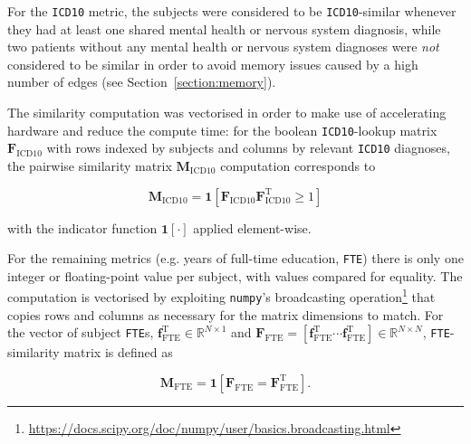 For the \texttt{ICD10} metric, the subjects were considered to be \texttt{ICD10}-similar whenever they had at least one shared mental health or nervous system diagnosis, while two patients without any mental health or nervous system diagnoses were \textit{not} considered to be similar in order to avoid memory issues caused by a high number of edges (see Section~\ref{section:memory}). 

The similarity computation was vectorised in order to make use of accelerating hardware and reduce the compute time: for the boolean \texttt{ICD10}-lookup matrix $\mathbf{F}_{\text{ICD10}}$ with rows indexed by subjects and columns by relevant \texttt{ICD10} diagnoses, the pairwise similarity matrix $\mathbf{M}_{\text{ICD10}}$ computation corresponds to 

\begin{equation}
    \mathbf{M}_{\text{ICD10}} = \mathbf{1}\left[\mathbf{F}_{\text{ICD10}}^{\ }\mathbf{F}_{\text{ICD10}}^{\mathrm{T}} \geq 1\right]
\end{equation}

with the indicator function $\mathbf{1}[\cdot]$ applied element-wise.

For the remaining metrics (e.g. years of full-time education, \texttt{FTE}) there is only one integer or floating-point value per subject, with values  compared for equality. The computation is vectorised by exploiting \texttt{numpy}'s broadcasting operation\footnote{\url{https://docs.scipy.org/doc/numpy/user/basics.broadcasting.html}} that copies rows and columns as necessary for the matrix dimensions to match. For the vector of subject \texttt{FTE}s, $\mathbf{f}_{\text{FTE}}^{\mathrm{T}} \in \mathbb{R}^{N \times 1}$ and $\mathbf{F}_{\text{FTE}} = [\mathbf{f}_{\text{FTE}}^{\mathrm{T}} \cdots \mathbf{f}_{\text{FTE}}^{\mathrm{T}}] \in \mathbb{R}^{N \times N}$, \texttt{FTE}-similarity matrix is defined as

\begin{equation}
    \mathbf{M}_{\text{FTE}} = \mathbf{1}\left[\mathbf{F}_{\text{FTE}}^{\ } = \mathbf{F}_{\text{FTE}}^{\mathrm{T}} \right].
\end{equation}





